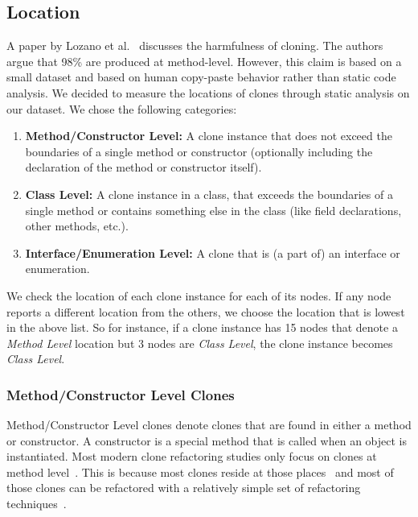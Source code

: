\documentclass[runningheads]{llncs}
\begin{document}
\subsection{Location}\label{sec:setuplocation}
A paper by Lozano et al.~\cite{lozano2007evaluating} discusses the harmfulness of cloning. The authors argue that 98\% are produced at method-level. However, this claim is based on a small dataset and based on human copy-paste behavior rather than static code analysis. We decided to measure the locations of clones through static analysis on our dataset. We chose the following categories:
\begin{enumerate}
  \item \textbf{Method/Constructor Level:} A clone instance that does not exceed the boundaries of a single method or constructor (optionally including the declaration of the method or constructor itself).
  \item \textbf{Class Level:} A clone instance in a class, that exceeds the boundaries of a single method or contains something else in the class (like field declarations, other methods, etc.).
  \item \textbf{Interface/Enumeration Level:} A clone that is (a part of) an interface or enumeration.
\end{enumerate}
We check the location of each clone instance for each of its nodes. If any node reports a different location from the others, we choose the location that is lowest in the above list. So for instance, if a clone instance has 15 nodes that denote a \textit{Method Level} location but 3 nodes are \textit{Class Level}, the clone instance becomes \textit{Class Level}.

\subsubsection{Method/Constructor Level Clones} \label{sec:methodlevelcr}
Method/Constructor Level clones denote clones that are found in either a method or constructor. A constructor is a special method that is called when an object is instantiated. Most modern clone refactoring studies only focus on clones at method level~\cite{choi2011extracting, yue2018automatic, kodhai2013method, arcelli2013software, lin2014clonepedia, mandal2014automatic, balazinska2000advanced, yongting2018detection, bouktif2006novel, fanqi2014using, devi2016study}. This is because most clones reside at those places~\cite{lozano2007evaluating, fontana2015duplicated} and most of those clones can be refactored with a relatively simple set of refactoring techniques~\cite{kodhai2013method, fontana2015duplicated}.
\end{document}
